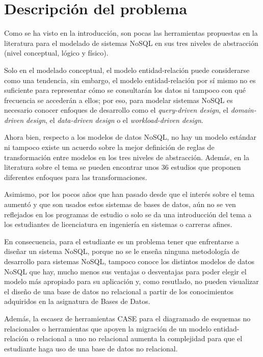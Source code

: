 \section{Descripción del problema}
Como se ha visto en la introducción, son pocas las herramientas propuestas en la literatura para el modelado de sistemas NoSQL en sus tres niveles de abstracción (nivel conceptual, lógico y físico).


Solo en el modelado conceptual, el modelo entidad-relación puede considerarse como una tendencia, sin embargo, el modelo entidad-relación por sí mismo no es suficiente para representar cómo se consultarán los datos ni tampoco con qué frecuencia se accederán a ellos; por eso, para modelar sistemas NoSQL es necesario conocer enfoques de desarrollo como el \textit{query-driven design}, el \textit{domain-driven design}, el \textit{data-driven design} o el \textit{workload-driven design}.


Ahora bien, respecto a los modelos de datos NoSQL, no hay un modelo estándar ni tampoco existe un acuerdo sobre la mejor definición de reglas de transformación entre modelos en los tres niveles de abstracción. Además, en la literatura sobre el tema se pueden encontrar unos 36 estudios que proponen diferentes enfoques para las transformaciones.


Asimismo, por los pocos años que han pasado desde que el interés sobre el tema aumentó y que son usados estos sistemas de bases de datos, aún no se ven reflejados en los programas de estudio o solo se da una introducción del tema a los estudiantes de licenciatura en ingeniería en sistemas o carreras afines. 


En consecuencia, para el estudiante es un problema tener que enfrentarse a diseñar un sistema NoSQL, porque no se le enseña ninguna metodología de desarrollo para sistemas NoSQL, tampoco conoce los distintos modelos de datos NoSQL que hay, mucho menos sus ventajas o desventajas para poder elegir el modelo más apropiado para su aplicación y, como resutlado, no pueden visualizar el diseño de una base de datos no relacional a partir de los conocimientos adquiridos en la asignatura de Bases de Datos.


Además, la escasez de herramientas CASE para el diagramado de esquemas no relacionales o herramientas que apoyen la migración de un modelo entidad-relación o relacional a uno no relacional aumenta la complejidad para que el estudiante haga uso de una base de datos no relacional.

